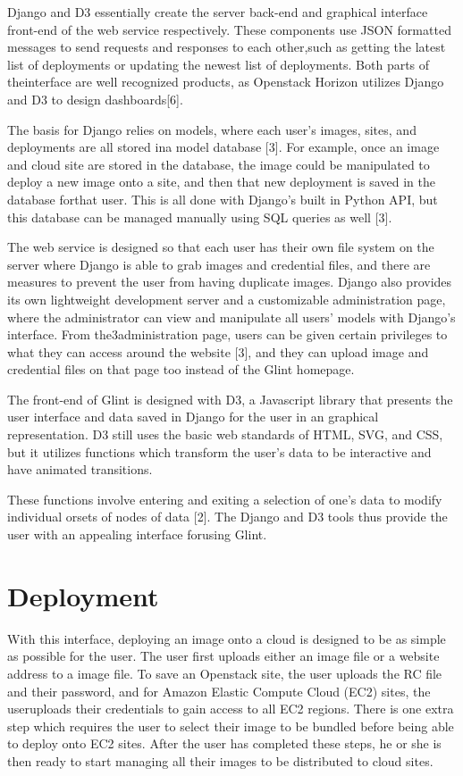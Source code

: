 \documentclass[a4paper]{jpconf}
\begin{document}
Django and D3 essentially create the server back-end and graphical interface front-end of the web service
respectively. 
These components use JSON formatted messages to send requests and responses to each other,such 
as getting the latest list of deployments or updating the newest list of deployments. 
Both parts of theinterface are well recognized products, as Openstack Horizon utilizes Django 
and D3 to design dashboards[6].

The basis for Django relies on models, where each user’s images, sites, and deployments are all 
stored ina model database [3]. 
For example, once an image and cloud site are stored in the database, the image could
be manipulated to deploy a new image onto a site, and then that new deployment is saved 
in the database forthat user. 
This is all done with Django’s built in Python API, but this database can be managed manually
using SQL queries as well [3].

The web service is designed so that each user has their own file system on the server where Django is
able to grab images and credential files, and there are measures to prevent the user from having duplicate images. 
Django also provides its own lightweight development server and a customizable administration
page, where the administrator can view and manipulate all users’ models with Django’s interface. 
From the3administration page, users can be given certain privileges to what they can access around the website [3],
and they can upload image and credential files on that page too instead of the Glint homepage.

The front-end of Glint is designed with D3, a Javascript library that presents the user interface and data
saved in Django for the user in an graphical representation. D3 still uses the basic web standards of HTML,
SVG, and CSS, but it utilizes functions which transform the user’s data to be interactive and have animated
transitions. 

These functions involve entering and exiting a selection of one’s data to modify individual orsets of nodes of data [2]. 
The Django and D3 tools thus provide the user with an appealing interface forusing Glint.


\section{Deployment}

With this interface, deploying an image onto a cloud is designed to be as simple as possible for the user. 
The user first uploads either an image file or a website address to a image file. 
To save an Openstack site, the user uploads the RC file and their password, and for 
Amazon Elastic Compute Cloud (EC2) sites, the useruploads their credentials to gain access to all EC2 regions. 
There is one extra step which requires the user to select their image to be bundled before being 
able to deploy onto EC2 sites. After the user has completed these steps, he or she is then ready to 
start managing all their images to be distributed to cloud sites.
\end{document}
